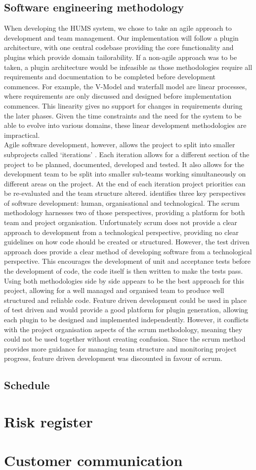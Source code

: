 \documentclass[10pt,a4paper]{article}
\begin{document}
\subsection{Software engineering methodology}
When developing the HUMS system, we chose to take an agile approach to development and team management. Our implementation will follow a plugin architecture, with one central codebase providing the core functionality and plugins which provide domain tailorability. If a non-agile approach was to be taken, a plugin architecture would be infeasible as those methodologies require all requirements and documentation to be completed before development commences. For example, the V-Model and waterfall model are linear processes, where requirements are only discussed and designed before implementation commences. This linearity gives no support for changes in requirements during the later phases. Given the time constraints and the need for the system to be able to evolve into various domains, these linear development methodologies are impractical. \\
Agile software development, however, allows the project to split into smaller subprojects called `iterations' \cite{hazzan2008agile}. Each iteration allows for a different section of the project to be planned, documented, developed and tested. It also allows for the development team to be split into smaller sub-teams working simultaneously on different areas on the project. At the end of each iteration project priorities can be re-evaluated and the team structure altered. 
\cite{hazzan2008agile} identifies three key perspectives of software development: human, organisational and technological. The scrum methodology harnesses two of those perspectives, providing a platform for both team and project organisation. Unfortunately scrum does not provide a clear approach to development from a technological perspective, providing no clear guidelines on how code should be created or structured. However, the test driven approach does provide a clear method of developing software from a technological perspective. This encourages the development of unit and acceptance tests before the development of code, the code itself is then written to make the tests pass. Using both methodologies side by side appears to be the best approach for this project, allowing for a well managed and organised team to produce well structured and reliable code. Feature driven development could be used in place of test driven and would provide a good platform for plugin generation, allowing each plugin to be designed and implemented independently. However, it conflicts with the project organisation aspects of the scrum methodology, meaning they could not be used together without creating confusion. Since the scrum method provides more guidance for managing team structure and monitoring project progress, feature driven development was discounted in favour of scrum.

\subsection{Schedule}


\section{Risk register}
%


\section{Customer communication}
\end{document}
